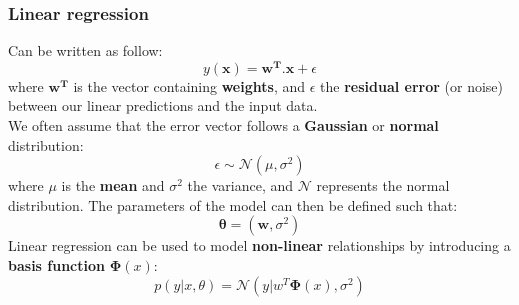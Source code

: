 \documentclass[a4paper,11pt]{article}
\begin{document}
	\subsubsection{Linear regression}
	Can be written as follow:
	\[
	y(\mathbf{x}) = \mathbf{w^T}.\mathbf{x} + \epsilon
	\]
	where $\mathbf{w^T}$ is the vector containing \textbf{weights}, and $\epsilon$ the \textbf{residual error} (or noise) between our linear predictions and the input data.\\
	We often assume that the error vector follows a \textbf{Gaussian} or \textbf{normal} distribution:
	\[
	\epsilon \sim \mathcal{N}(\mu, \sigma^2)
	\]
	where $\mu$ is the \textbf{mean} and $\sigma^2$ the variance, and $\mathcal{N}$ represents the normal distribution. The parameters of the model can then be defined such that:
	\[
	\mathbf{\theta}=(\mathbf{w},\sigma^2)
	\]
	Linear regression can be used to model \textbf{non-linear} relationships by introducing a \textbf{basis function} $\mathbf{\Phi}(x)$:
	\[
	p(y | x,\theta) = \mathcal{N}(y| w^T\mathbf{\Phi}(x),\sigma^2) 
	\]
	\pagebreak
\end{document}
